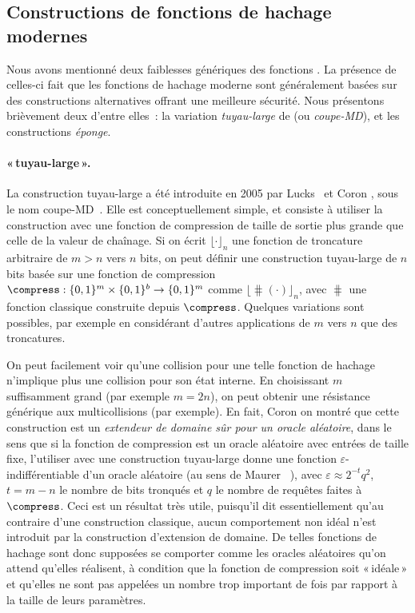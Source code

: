 \subsection{Constructions de fonctions de hachage modernes}
\label{sec:fbetter}

Nous avons mentionné deux faiblesses génériques des fonctions \merkdam. La présence de celles-ci fait que les fonctions de hachage moderne sont généralement
basées sur des constructions alternatives offrant une meilleure sécurité. Nous présentons brièvement deux d'entre elles~: la
variation \emph{tuyau-large} de \merkdam (ou \emph{coupe-MD}), et les constructions \emph{éponge}. 


\paragraph{\merkdam «\,tuyau-large\,».}
La construction tuyau-large a été introduite en 2005 par Lucks~\cite{DBLP:conf/asiacrypt/Lucks05}
et Coron \etal, sous le nom coupe-MD~\cite{DBLP:conf/crypto/CoronDMP05}.
Elle est conceptuellement simple, et consiste à utiliser la construction \merkdam avec une fonction de compression de taille de sortie plus grande que celle de la valeur de chaînage.
Si on écrit
$\lfloor\cdot\rfloor_n$
une fonction de troncature arbitraire de $m > n$ vers $n$ bits, on peut définir
une construction tuyau-large de $n$ bits basée sur une fonction de compression $\compress : \{0,1\}^m \times \{0,1\}^b \rightarrow \{0,1\}^m$
comme $\lfloor\hash(\cdot)\rfloor_n$, avec $\hash$ une fonction \merkdam classique construite depuis $\compress$.
Quelques variations sont possibles, par exemple en considérant d'autres applications de $m$ vers $n$ que des troncatures.

On peut facilement voir qu'une collision pour une telle fonction de hachage n'implique plus une collision pour son état interne.
En choisissant $m$ suffisamment grand (par exemple $m = 2n$),
on peut obtenir une résistance générique aux multicollisions (par exemple). En fait,
Coron \etal on montré que cette construction est un \emph{extendeur de domaine sûr pour un oracle aléatoire}, dans le sens
que si la fonction de compression est un oracle aléatoire avec entrées de taille fixe, l'utiliser avec une construction tuyau-large donne une fonction
$\varepsilon$-indifférentiable d'un oracle aléatoire
(au sens de Maurer \etal~\cite{DBLP:conf/tcc/MaurerRH04}), avec
$\varepsilon \approx 2^{-t}q^2$, $t = m - n$ le nombre de bits tronqués et $q$ le nombre de requêtes faites à $\compress$.
Ceci est un résultat très utile, puisqu'il dit essentiellement qu'au contraire d'une construction \merkdam classique, aucun comportement non idéal
n'est introduit par la construction d'extension de domaine. De telles fonctions de hachage sont donc supposées se comporter comme les oracles aléatoires
qu'on attend qu'elles réalisent, à condition que la fonction de compression soit «\,idéale\,» et qu'elles ne sont pas appelées un nombre trop important de fois par rapport à la taille de leurs paramètres.


